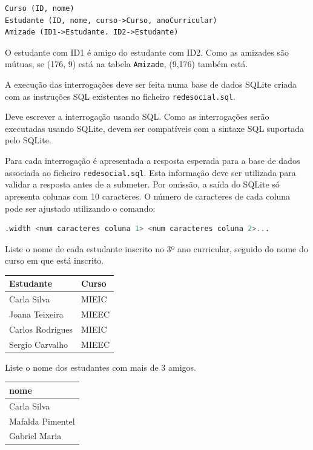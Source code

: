 \documentclass[type=normal, year=2015/16]{bdad_exam}
\begin{document}
{\begin{lstlisting}[numbers=none]
Curso (ID, nome)
Estudante (ID, nome, curso->Curso, anoCurricular)
Amizade (ID1->Estudante. ID2->Estudante)
\end{lstlisting}

O estudante com ID1 é amigo do estudante com ID2. Como as amizades são mútuas, se (176, 9) está na tabela \texttt{Amizade}, (9,176) também está.

A execução das interrogações deve ser feita numa base de dados SQLite criada com as instruções SQL existentes no ficheiro \texttt{redesocial.sql}.

Deve escrever a interrogação usando SQL. Como as interrogações serão executadas usando SQLite, devem ser compatíveis com a sintaxe SQL suportada pelo SQLite.

Para cada interrogação é apresentada a resposta esperada para a base de dados associada ao ficheiro \texttt{redesocial.sql}. Esta informação deve ser utilizada para validar a resposta antes de a submeter. Por omissão, a saída do SQLite só apresenta colunas com 10 caracteres. O número de caracteres de cada coluna pode ser ajustado utilizando o comando:

\begin{lstlisting}[language=SQL,numbers=none]
.width <num caracteres coluna 1> <num caracteres coluna 2>...
\end{lstlisting}

Liste o nome de cada estudante inscrito no 3º ano curricular, seguido do nome do curso em que está inscrito.
\begin{center} \begin{tabular}{l | l}
    \textbf{Estudante} & \textbf{Curso} \\ \hline
    Carla Silva        & MIEIC          \\
    Joana Teixeira     & MIEEC          \\
    Carlos Rodrigues   & MIEIC          \\
    Sergio Carvalho    & MIEEC
\end{tabular} \end{center}
\ansseparator


Liste o nome dos estudantes com mais de 3 amigos.
\begin{center} \begin{tabular}{l}
    \textbf{nome}    \\ \hline
    Carla Silva      \\
    Mafalda Pimentel \\
    Gabriel Maria
\end{tabular} \end{center}


}
\end{document}
